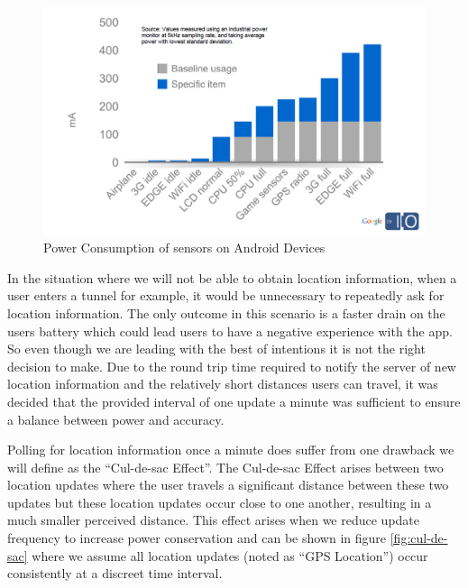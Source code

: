 \begin{figure}[h]
  \centering
  \includegraphics[width=\textwidth]{images/power.png}
  \caption{Power Consumption of sensors on Android Devices \cite{android_efficiencySlides}}
  \label{fig:power}
\end{figure}

In the situation where we will not be able to obtain location
information, when a user enters a tunnel for example, it would be
unnecessary to repeatedly ask for location information. The only
outcome in this scenario is a faster drain on the users battery which
could lead users to have a negative experience with the app. So even
though we are leading with the best of intentions it is not the right
decision to make. Due to the round trip time required to notify the
server of new location information and the relatively short distances
users can travel, it was decided that the provided interval of one
update a minute was sufficient to ensure a balance between power and
accuracy. 

Polling for location information once a minute does suffer from one
drawback we will define as the ``Cul-de-sac Effect''. The Cul-de-sac
Effect arises between two location updates where the user travels a
significant distance between these two updates but these location
updates occur close to one another, resulting in a much smaller
perceived distance. This effect arises when we reduce update
frequency to increase power conservation and can be shown in figure 
\ref{fig:cul-de-sac} where we assume all location updates (noted as
``GPS Location'') occur consistently at a discreet time interval. 

